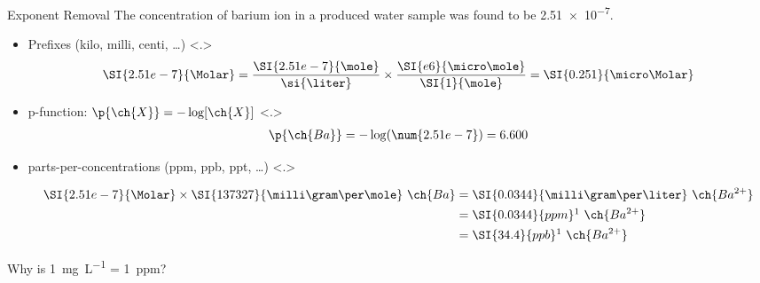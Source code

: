 \documentclass[notes=show]{beamer}
\begin{document}
\begin{frame}[t]{Exponent Removal}
	The concentration of barium ion in a produced water sample was found to
	be \SI{2.51e-7}{\Molar}.

	\begin{itemize}[<+->]
		\item Prefixes (kilo, milli, centi, \ldots)
			\only<.>{%
				\begin{align*}
					\SI{2.51e-7}{\Molar} =
					\dfrac{\SI{2.51e-7}{\mole}}{\si{\liter}}
					\times
					\dfrac{\SI{e6}{\micro\mole}}{\SI{1}{\mole}} =
					\SI{0.251}{\micro\Molar}
				\end{align*}
			}
		\item p-function: $\p{\ch{X}} = -\log [\ch{X}]$
			\only<.>{%
				\begin{align*}
					\p{\ch{Ba}} = -\log(\num{2.51e-7}) = 6.600
				\end{align*}
			}
		\item parts-per-concentrations (ppm, ppb, ppt, \ldots)
			\only<.>{%
				\begin{align*}
					\SI{2.51e-7}{\Molar} \times
					\SI{137327}{\milli\gram\per\mole}~\ch{Ba} &=
					\SI{0.0344}{\milli\gram\per\liter}~\ch{Ba^{2+}}
					\\
					&= \SI{0.0344}{ppm}\footnotemark[1]~\ch{Ba^{2+}} \\
					&= \SI{34.4}{ppb}\footnotemark[1]~\ch{Ba^{2+}}
				\end{align*}

				\bigskip
			}
	\end{itemize}
\end{frame}

\begin{frame}{Why is \SI{1}{\milli\gram\per\liter} = \SI{1}{ppm}?}


\end{frame}
\end{document}
